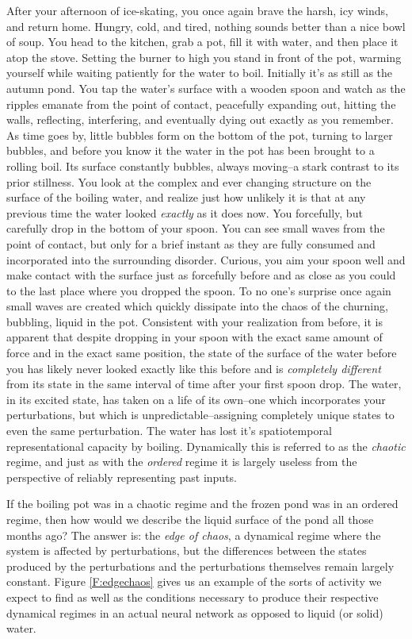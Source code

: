 After your afternoon of ice-skating, you once again brave the harsh, icy winds, and return home. Hungry, cold, and tired, nothing sounds better than a nice bowl of soup. You head to the kitchen, grab a pot, fill it with water, and then place it atop the stove. Setting the burner to high you stand in front of the pot, warming yourself while waiting patiently for the water to boil. Initially it's as still as the autumn pond. You tap the water's surface with a wooden spoon and watch as the ripples emanate from the point of contact, peacefully expanding out, hitting the walls, reflecting, interfering, and eventually dying out exactly as you remember. As time goes by, little bubbles form on the bottom of the pot, turning to larger bubbles, and before you know it the water in the pot has been brought to a rolling boil. Its surface constantly bubbles, always moving--a stark contrast to its prior stillness. You look at the complex and ever changing structure on the surface of the boiling water, and realize just how unlikely it is that at any previous time the water looked \emph{exactly} as it does now. You forcefully, but carefully drop in the bottom of your spoon. You can see small waves from the point of contact, but only for a brief instant as they are fully consumed and incorporated into the surrounding disorder. Curious, you aim your spoon well and make contact with the surface just as forcefully before and as close as you could to the last place where you dropped the spoon. To no one's surprise once again small waves are created which quickly dissipate into the chaos of the churning, bubbling, liquid in the pot. Consistent with your realization from before, it is apparent that despite dropping in your spoon with the exact same amount of force and in the exact same position, the state of the surface of the water before you has likely never looked exactly like this before and is \emph{completely different} from its state in the same interval of time after your first spoon drop. The water, in its excited state, has taken on a life of its own--one which incorporates your perturbations, but which is unpredictable--assigning completely unique states to even the same perturbation. The water has lost it's spatiotemporal representational capacity by boiling. Dynamically this is referred to as the \emph{chaotic} regime, and just as with the \emph{ordered} regime it is largely useless from the perspective of reliably representing past inputs.

If the boiling pot was in a chaotic regime and the frozen pond was in an ordered regime, then how would we describe the liquid surface of the pond all those months ago? The answer is: the \emph{edge of chaos}, a dynamical regime where the system is affected by perturbations, but the differences between the states produced by the perturbations and the perturbations themselves remain largely constant. Figure \ref{F:edgechaos} gives us an example of the sorts of activity we expect to find as well as the conditions necessary to produce their respective dynamical regimes in an actual neural network as opposed to liquid (or solid) water. 

